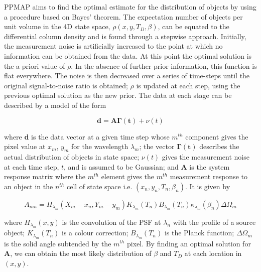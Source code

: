 \documentclass[fleqn,usenatbib]{mnras}
\begin{document}
{PPMAP aims to find the optimal estimate for the distribution of objects by using a procedure based on Bayes' theorem. The expectation number of objects per unit volume in the 4D state space, $\rho(x, y, T_D, \beta)$, can be equated to the differential column density and is found through a stepwise approach. Initially, the measurement noise is artificially increased to the point at which no information can be obtained from the data. At this point the optimal solution is the a priori value of $\rho$. In the absence of further prior information, this function is flat everywhere. %
The noise is then decreased over a series of time-steps until the original signal-to-noise ratio is obtained; $\rho$ is updated at each step, using the previous optimal solution as the new prior. The data at each stage can be described by a model of the form

\begin{equation} \label{eqn:ppmap_data_model}
	\mathbf{d} = \mathbf{A}\mathbf{\Gamma(t)} + \nu(t)
\end{equation}

where \textbf{d} is the data vector at a given time step whose $m^{th}$ component gives the pixel value at $x_m$, $y_m$ for the wavelength $\lambda_m$; the vector $\mathbf{\Gamma(t)}$ describes the actual distribution of objects in state space; $\nu(t)$ gives the measurement noise at each time step, $t$, and is assumed to be Gaussian; and $\mathbf{A}$ is the system response matrix where the $m^{th}$ element gives the $m^{th}$ measurement response to an object in the $n^{th}$ cell of state space i.e. $(x_n, y_n, T_n, \beta_n)$. It is given by

\begin{equation} \label{eqn:ppmap_response}
	A_{mn} = H_{\lambda_m}(X_m - x_n, Y_m - y_m) K_{\lambda_m}(T_n) B_{\lambda_m}(T_n) \kappa_{\lambda_m}(\beta_n) \Delta \Omega_m
\end{equation}

where $H_{\lambda_m}(x, y)$ is the convolution of the PSF at $\lambda_n$ with the profile of a source object; $K_{\lambda_m}(T_n)$ is a colour correction; $B_{\lambda_m}(T_n)$ is the Planck function; $\Delta \Omega_m$ is the solid angle subtended by the $m^{th}$ pixel. By finding an optimal solution for \textbf{A}, we can obtain the most likely distribution of $\beta$ and $T_D$ at each location in $(x, y)$.

}
\end{document}
